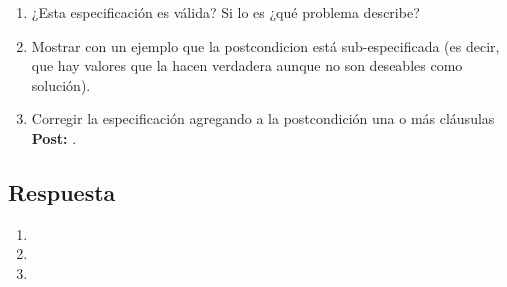 \documentclass[a4paper]{article}
\begin{document}
	\begin{enumerate}[label=\alph*)]
		\item ¿Esta especificación es válida? Si lo es ¿qué problema describe?
		\item Mostrar con un ejemplo que la postcondicion está sub-especificada (es decir, que 
				hay valores que la hacen verdadera aunque no son deseables como solución).
		\item Corregir la especificación agregando a la postcondición una o más cláusulas
			 \textbf{Post: }.
	\end{enumerate}
\subsection*{Respuesta}
	\begin{enumerate}[label=\alph*)]
		\item
		\item
		\item
	\end{enumerate}
	
\end{document}
